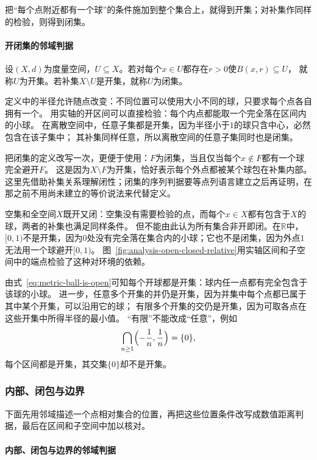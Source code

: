 把“每个点附近都有一个球”的条件施加到整个集合上，就得到开集；对补集作同样的检验，则得到闭集。

\paragraph{开闭集的邻域判据}

\begin{definition}[开集与闭集]
\label{def:metric-open-closed}
设$(X,d)$为度量空间，$U\subseteq X$。若对每个$x\in U$都存在$r>0$使$B(x,r)\subseteq U$，
就称$U$为开集。若补集$X\setminus U$是开集，就称$U$为闭集。
\end{definition}

定义中的半径允许随点改变：不同位置可以使用大小不同的球，只要求每个点各自拥有一个。
用实轴的开区间可以直接检验：每个内点都能取一个完全落在区间内的小球。
在离散空间中，任意子集都是开集，因为半径小于$1$的球只含中心，必然包含在该子集中；
其补集同样任意，所以离散空间的任意子集同时也是闭集。

把闭集的定义改写一次，更便于使用：$F$为闭集，当且仅当每个$x\notin F$都有一个球完全避开$F$。
这是因为$X\setminus F$为开集，恰好表示每个外点都被某个球包在补集内部。
这里先借助补集关系理解闭性；闭集的序列判据要等点列语言建立之后再证明，在那之前不用尚未建立的等价说法来代替定义。

空集和全空间$X$既开又闭：空集没有需要检验的点，而每个$x\in X$都有包含于$X$的球，两者的补集也满足同样条件。
但不能由此认为所有集合非开即闭。在$\mathbb R$中，$[0,1)$不是开集，因为$0$处没有完全落在集合内的小球；它也不是闭集，因为外点$1$无法用一个球避开$[0,1)$。
图~\ref{fig:analysis-open-closed-relative}用实轴区间和子空间中的端点检验了这种对环境的依赖。

由式~\eqref{eq:metric-ball-is-open}可知每个开球都是开集：球内任一点都有完全包含于该球的小球。
进一步，任意多个开集的并仍是开集，因为并集中每个点都已属于其中某个开集，可以沿用它的球；
有限多个开集的交仍是开集，因为可取各点在这些开集中所得半径的最小值。
“有限”不能改成“任意”，例如
\[
  \bigcap_{n\geq1}\Bigl(-\frac1n,\frac1n\Bigr)=\{0\},
\]
每个区间都是开集，其交集$\{0\}$却不是开集。

\subsubsection{内部、闭包与边界}
\label{sec:metric-interior-closure-boundary}

下面先用邻域描述一个点相对集合的位置，再把这些位置条件改写成数值距离判据，最后在区间和子空间中加以核对。

\paragraph{内部、闭包与边界的邻域判据}

